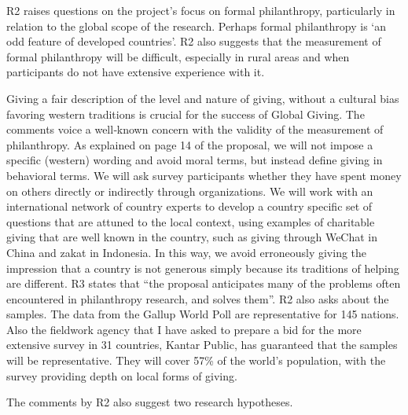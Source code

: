 \documentclass[twocolumn, serif, rga, numeric]{jote-article}
\begin{document}
R2 raises questions on the project’s focus on formal philanthropy, particularly in relation to the global scope of the research. Perhaps formal philanthropy is ‘an odd feature of developed countries’. R2 also suggests that the measurement of formal philanthropy will be difficult, especially in rural areas and when participants do not have extensive experience with it.

Giving a fair description of the level and nature of giving, without a cultural bias favoring western traditions is crucial for the success of Global Giving. The comments voice a well‐known concern with the validity of the measurement of philanthropy. As explained on page 14 of the proposal, we will not impose a specific (western) wording and avoid moral terms, but instead define giving in behavioral terms. We will ask survey participants whether they have spent money on others directly or indirectly through organizations. We will work with an international network of country experts to develop a country specific set of questions that are attuned to the local context, using examples of charitable giving that are well known in the country, such as giving through WeChat in China and zakat in Indonesia. In this way, we avoid erroneously giving the impression that a country is not generous simply because its traditions of helping are different. R3 states that “the proposal anticipates many of the problems often encountered in philanthropy research, and solves them”.
R2 also asks about the samples. The data from the Gallup World Poll are representative for 145 nations. Also the fieldwork agency that I have asked to prepare a bid for the more extensive survey in 31 countries, Kantar Public, has guaranteed that the samples will be representative. They will cover 57\% of the world’s population, with the survey providing depth on local forms of giving.

The comments by R2 also suggest two research hypotheses.
\end{document}
